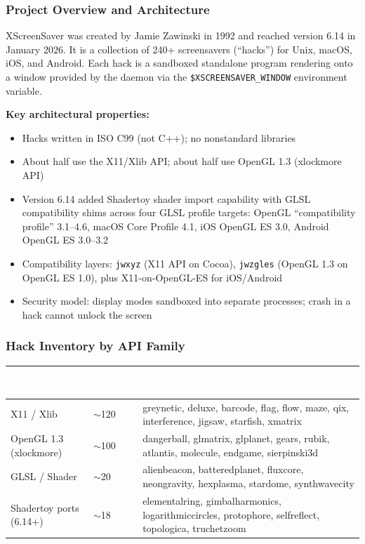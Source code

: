 \documentclass[11pt,letterpaper]{article}
\newcommand{\tableheader}[1]{\textbf{\sffamily\textcolor{white}{#1}}}
\begin{document}
\subsubsection{Project Overview and Architecture}

XScreenSaver was created by Jamie Zawinski in 1992 and reached version 6.14 in January 2026. It is a collection of 240+ screensavers (``hacks'') for Unix, macOS, iOS, and Android. Each hack is a sandboxed standalone program rendering onto a window provided by the daemon via the \texttt{\$XSCREENSAVER\_WINDOW} environment variable.

\textbf{Key architectural properties:}
\begin{itemize}
\item Hacks written in ISO C99 (not C++); no nonstandard libraries
\item About half use the X11/Xlib API; about half use OpenGL 1.3 (xlockmore API)
\item Version 6.14 added Shadertoy shader import capability with GLSL compatibility shims across four GLSL profile targets: OpenGL ``compatibility profile'' 3.1--4.6, macOS Core Profile 4.1, iOS OpenGL ES 3.0, Android OpenGL ES 3.0--3.2
\item Compatibility layers: \texttt{jwxyz} (X11 API on Cocoa), \texttt{jwzgles} (OpenGL 1.3 on OpenGL ES 1.0), plus X11-on-OpenGL-ES for iOS/Android
\item Security model: display modes sandboxed into separate processes; crash in a hack cannot unlock the screen
\end{itemize}

\subsubsection{Hack Inventory by API Family}

\begin{center}
\begin{tabularx}{\textwidth}{L{3cm}L{2cm}X}
\toprule
{}
\tableheader{API Family} & \tableheader{Est. Count} & \tableheader{Examples} \\
\midrule
X11 / Xlib & $\sim$120 & greynetic, deluxe, barcode, flag, flow, maze, qix, interference, jigsaw, starfish, xmatrix \\
OpenGL 1.3 (xlockmore) & $\sim$100 & dangerball, glmatrix, glplanet, gears, rubik, atlantis, molecule, endgame, sierpinski3d \\
GLSL / Shader & $\sim$20 & alien\-beacon, battered\-planet, fluxcore, neon\-gravity, hex\-plasma, stardome, synth\-wave\-city \\
Shadertoy ports (6.14+) & $\sim$18 & elementalring, gimbal\-harmonics, logarithmic\-circles, protophore, selfreflect, topologica, truchetzoom \\
\bottomrule
\end{tabularx}
\end{center}
\end{document}
